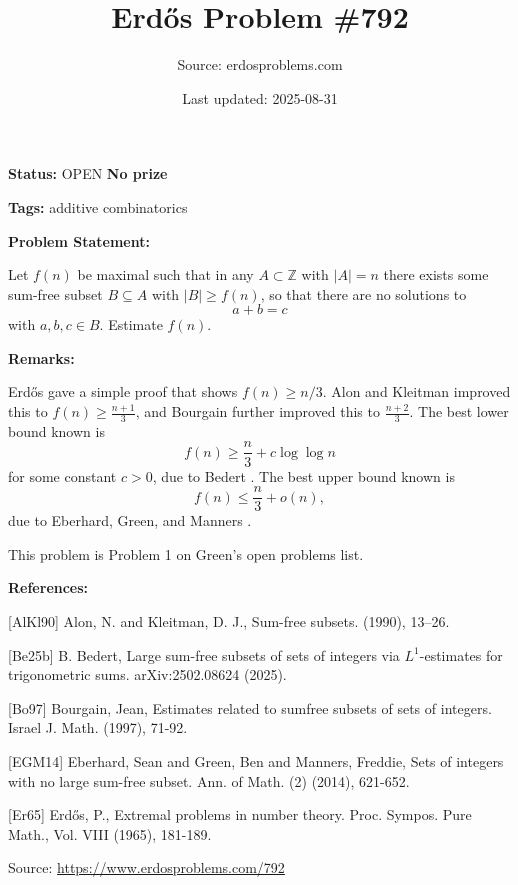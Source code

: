 \documentclass{article}
\title{Erd\H{o}s Problem \#792}
\date{Last updated: 2025-08-31}
\author{Source: erdosproblems.com}
\begin{document}
\maketitle

\noindent\textbf{Status:} OPEN \quad \textbf{No prize}

\noindent\textbf{Tags:} additive combinatorics

\medskip
\noindent\textbf{Problem Statement:}

Let $f(n)$ be maximal such that in any $A\subset \mathbb{Z}$ with $\lvert A\rvert=n$ there exists some sum-free subset $B\subseteq A$ with $\lvert B\rvert \geq f(n)$, so that there are no solutions to\[a+b=c\]with $a,b,c\in B$. Estimate $f(n)$.

\bigskip
\noindent\textbf{Remarks:}

Erd\H{o}s \cite{Er65} gave a simple proof that shows $f(n) \geq n/3$. Alon and Kleitman \cite{AlKl90} improved this to $f(n)\geq \frac{n+1}{3}$, and Bourgain \cite{Bo97} further improved this to $\frac{n+2}{3}$. The best lower bound known is\[f(n)\geq \frac{n}{3}+c\log\log n\]for some constant $c>0$, due to Bedert \cite{Be25b}. The best upper bound known is\[f(n) \leq \frac{n}{3}+o(n),\]due to Eberhard, Green, and Manners \cite{EGM14}.

This problem is Problem 1 on Green's open problems list.

\bigskip
\noindent\textbf{References:}

[AlKl90] Alon, N. and Kleitman, D. J., Sum-free subsets. (1990), 13--26.
 
 [Be25b] B. Bedert, Large sum-free subsets of sets of integers via $L^1$-estimates for trigonometric sums. arXiv:2502.08624 (2025).
 
 [Bo97] Bourgain, Jean, Estimates related to sumfree subsets of sets of integers. Israel J. Math. (1997), 71-92.
 
 [EGM14] Eberhard, Sean and Green, Ben and Manners, Freddie, Sets of integers with no large sum-free subset. Ann. of Math. (2) (2014), 621-652.
 
 [Er65] Erd\H{o}s, P., Extremal problems in number theory. Proc. Sympos. Pure Math., Vol. VIII (1965), 181-189.

\bigskip
\noindent\small{Source: \url{https://www.erdosproblems.com/792}}
\end{document}
